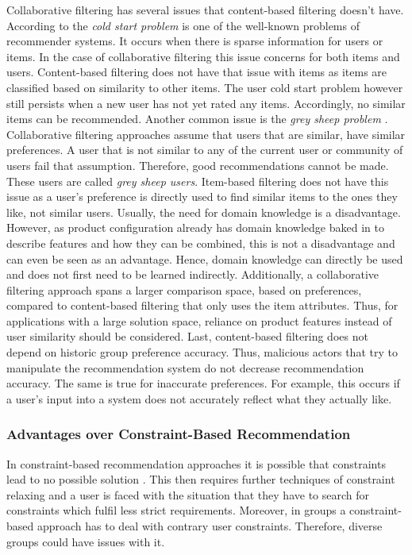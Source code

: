 Collaborative filtering has several issues that content-based filtering doesn't have. According to \citeauthor{likaFacingColdStart2014} \cite{likaFacingColdStart2014} the \emph{cold start problem} is one of the well-known problems of recommender systems. It occurs when there is sparse information for users or items. In the case of collaborative filtering this issue concerns for both items and users. Content-based filtering does not have that issue with items as items are classified based on similarity to other items. The user cold start problem however still persists when a new user has not yet rated any items. Accordingly, no similar items can be recommended. 
Another common issue is the \emph{grey sheep problem} \cite{grasIdentifyingGreySheep2016}. Collaborative filtering approaches assume that users that are similar, have similar preferences. A user that is not similar to any of the current user or community of users fail that assumption. Therefore, good recommendations cannot be made. These users are called \emph{grey sheep users}. Item-based filtering does not have this issue as a user's preference is directly used to find similar items to the ones they like, not similar users.
Usually, the need for domain knowledge is a disadvantage. However, as product configuration already has domain knowledge baked in to describe features and how they can be combined, this is not a disadvantage and can even be seen as an advantage. Hence, domain knowledge can directly be used and does not first need to be learned indirectly.
Additionally, a collaborative filtering approach spans a larger comparison space, based on preferences, compared to content-based filtering that only uses the item attributes. Thus, for applications with a large solution space, reliance on product features instead of user similarity should be considered.
Last, content-based filtering does not depend on historic group preference accuracy. Thus, malicious actors that try to manipulate the recommendation system do not decrease recommendation accuracy. The same is true for inaccurate preferences. For example, this occurs if a user's input into a system does not accurately reflect what they actually like.

\subsubsection{Advantages over Constraint-Based Recommendation}

In constraint-based recommendation approaches it is possible that constraints lead to no possible solution \cite[~ p. 44]{felfernigAlgorithmsGroupRecommendation2018}. This then requires further techniques of constraint relaxing and a user is faced with the situation that they have to search for constraints which fulfil less strict requirements. Moreover, in groups a constraint-based approach has to deal with contrary user constraints. Therefore, diverse groups could have issues with it.

